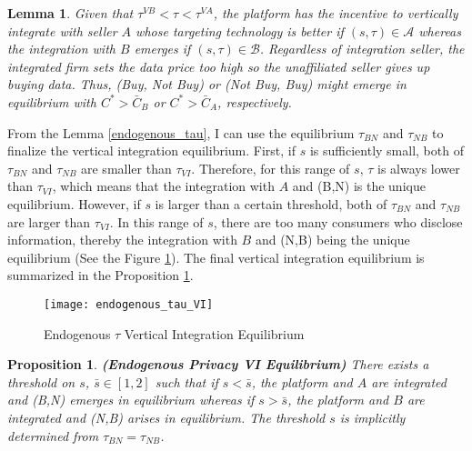 \documentclass[12pt]{article}
\newtheorem{lemma}{Lemma}
\newtheorem{proposition}{Proposition}
\begin{document}
\begin{lemma} \label{VIeqm}
Given that $\tau^{VB}<\tau<\tau^{VA}$, the platform has the incentive to vertically integrate with seller $A$ whose targeting technology is better if $(s,\tau) \in \mathcal{A}$ whereas the integration with $B$ emerges if $(s,\tau) \in \mathcal{B}$. Regardless of integration seller, the integrated firm sets the data price too high so the unaffiliated seller gives up buying data. Thus, (Buy, Not Buy)  or (Not Buy, Buy) might emerge in equilibrium with $C^*>\bar{C}_B$ or $C^*>\bar{C}_A$, respectively. 
\end{lemma}

From the Lemma \ref{endogenous_tau}, I can use the equilibrium $\tau_{BN}$ and $\tau_{NB}$ to finalize the vertical integration equilibrium. First, if $s$ is sufficiently small, both of $\tau_{BN}$ and $\tau_{NB}$ are smaller than $\tau_{VI}$. Therefore, for this range of $s$, $\tau$ is always lower than $\tau_{VI}$, which means that the integration with $A$ and (B,N) is the unique equilibrium. However, if $s$ is larger than a certain threshold, both of $\tau_{BN}$ and $\tau_{NB}$ are larger than $\tau_{VI}$. In this range of $s$, there are too many consumers who disclose information, thereby the integration with $B$ and (N,B) being the unique equilibrium (See the Figure \ref{endogenous_VI}). The final vertical integration equilibrium is summarized in the Proposition \ref{endogenous privacy VI eqm}. 
\begin{figure}[!tbp]
	\centering	\texttt{[image: endogenous\_tau\_VI]}
	\caption{Endogenous $\tau$ Vertical Integration Equilibrium}\label{endogenous_VI}
\end{figure}

\begin{proposition}\label{endogenous privacy VI eqm} \textbf{(Endogenous Privacy VI Equilibrium)} 
	There exists a threshold on $s$, $\bar{s} \in [1,2]$ such that if $s<\bar{s}$, the platform and $A$ are integrated and (B,N) emerges in equilibrium whereas if $s>\bar{s}$, the platform and $B$ are integrated and (N,B) arises in equilibrium. The threshold $s$ is implicitly determined from $\tau_{BN}=\tau_{NB}$.
\end{proposition}
\end{document}
